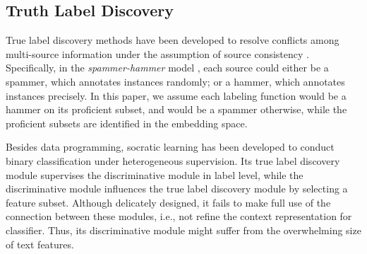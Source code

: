 \subsection{Truth Label Discovery}
True label discovery methods have been developed to resolve conflicts among multi-source information under the assumption of source consistency \cite{Li:2016:STD:2897350.2897352,zhi2015modeling}. Specifically, in the \emph{spammer-hammer} model \cite{karger2011iterative}, each source could either be a spammer, which annotates instances randomly; or a hammer, which annotates instances precisely. In this paper, we assume each labeling function would be a hammer on its proficient subset, and would be a spammer otherwise, while the proficient subsets are identified in the embedding space. 

Besides data programming, socratic learning \cite{varma2016socratic} has been developed to conduct binary classification under heterogeneous supervision. Its true label discovery module supervises the discriminative module in label level, while the discriminative module influences the true label discovery module by selecting a feature subset. Although delicately designed, it fails to make full use of the connection between these modules, i.e., not refine the context representation for classifier. Thus, its discriminative module might suffer from the overwhelming size of text features. 